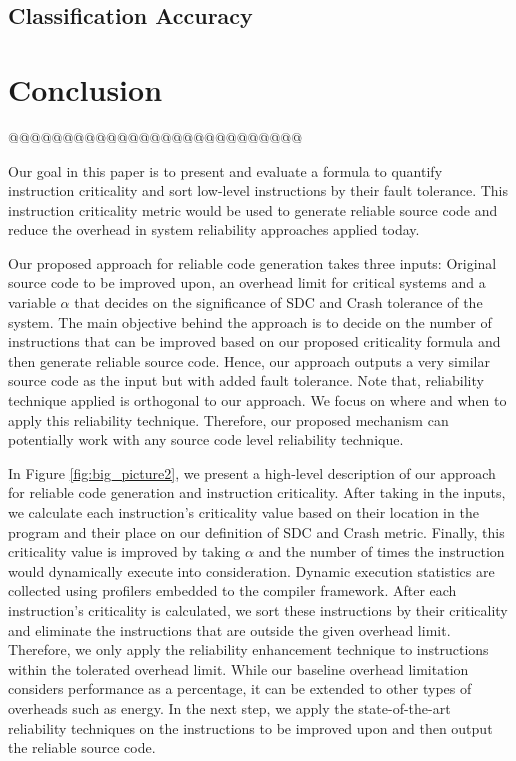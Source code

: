 \subsection{Classification Accuracy}

\section{Conclusion}\label{sec:conclusion}
@@@@@@@@@@@@@@@@@@@@@@@@@@@

Our goal in this paper is to present and evaluate a formula to quantify instruction criticality and sort low-level instructions by their fault tolerance. This instruction criticality metric would be used to generate reliable source code and reduce the overhead in system reliability approaches applied today. 

Our proposed approach for reliable code generation takes three inputs: Original source code to be improved upon, an overhead limit for critical systems and a variable $\alpha$ that decides on the significance of SDC and Crash tolerance of the system. The main objective behind the approach is to decide on the number of instructions that can be improved based on our proposed criticality formula and then generate reliable source code. Hence, our approach outputs a very similar source code as the input but with added fault tolerance. Note that, reliability technique applied is orthogonal to our approach. We focus on where and when to apply this reliability technique. Therefore, our proposed mechanism can potentially work with any source code level reliability technique. 

In Figure \ref{fig:big_picture2}, we present a high-level description of our approach for reliable code generation and instruction criticality. After taking in the inputs, we calculate each instruction's criticality value based on their location in the program and their place on our definition of SDC and Crash metric. Finally, this criticality value is improved by taking $\alpha$ and the number of times the instruction would dynamically execute into consideration. Dynamic execution statistics are collected using profilers embedded to the compiler framework. After each instruction's criticality is calculated, we sort these instructions by their criticality and eliminate the instructions that are outside the given overhead limit. Therefore, we only apply the reliability enhancement technique to instructions within the tolerated overhead limit. While our baseline overhead limitation considers performance as a percentage, it can be extended to other types of overheads such as energy. In the next step, we apply the state-of-the-art reliability techniques on the instructions to be improved upon and then output the reliable source code. 

